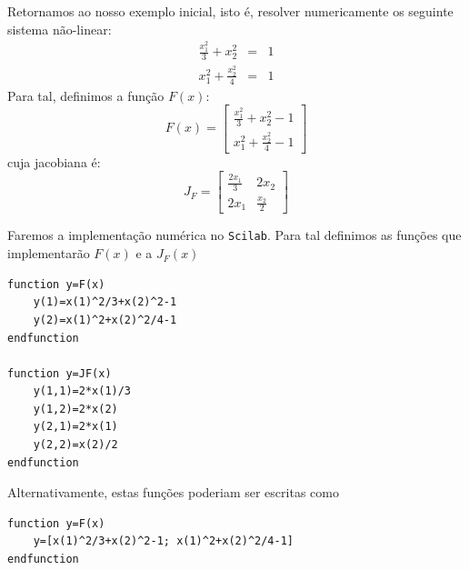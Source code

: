 \begin{ex} Retornamos ao nosso exemplo inicial, isto é, resolver numericamente os seguinte sistema não-linear:
\begin{eqnarray*}
\frac{x_1^2}{3}+x_2^2&=&1\\
x_1^2+\frac{x_2^2}{4}&=&1
\end{eqnarray*}
Para tal, definimos a função $F(x)$:
\begin{equation*}
  F(x)=\left[
\begin{array}{c}
\displaystyle \frac{x_1^2}{3}+x_2^2-1\\
\displaystyle x_1^2+\frac{x_2^2}{4}-1
\end{array}
\right]
\end{equation*}
cuja jacobiana é:
\begin{equation*}
  J_F=\left[\begin{array}{cc}
      \displaystyle \frac{2x_1}{3} & 2x_2\\
      \displaystyle 2x_1&\frac{x_2}{2}
    \end{array}\right]
\end{equation*}

\ifisscilab
Faremos a implementação numérica no \verb+Scilab+. Para tal definimos as funções que implementarão $F(x)$ e a $J_F(x)$
\begin{verbatim}
function y=F(x)
    y(1)=x(1)^2/3+x(2)^2-1
    y(2)=x(1)^2+x(2)^2/4-1
endfunction

function y=JF(x)
    y(1,1)=2*x(1)/3
    y(1,2)=2*x(2)
    y(2,1)=2*x(1)
    y(2,2)=x(2)/2
endfunction
\end{verbatim}
Alternativamente, estas funções poderiam ser escritas como
\begin{verbatim}
function y=F(x)
    y=[x(1)^2/3+x(2)^2-1; x(1)^2+x(2)^2/4-1]
endfunction


\end{verbatim}
\end{ex}
